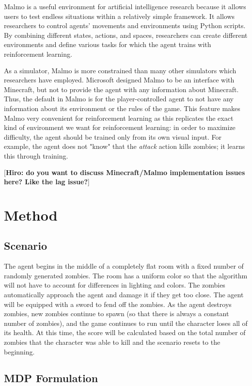 \documentclass{article}
\begin{document}
\begin{multicols}{2}
Malmo is a useful environment for artificial intelligence research because it allows users to test endless situations within a relatively simple framework. It allows researchers to control agents' movements and environments using Python scripts. By combining different states, actions, and spaces, researchers can create different environments and define various tasks for which the agent trains with reinforcement learning.

As a simulator, Malmo is more constrained than many other simulators which researchers have employed. Microsoft designed Malmo to be an interface with Minecraft, but not to provide the agent with any information about Minecraft.
Thus, the default in Malmo is for the player-controlled agent to not have any information about its environment or the rules of the game.
This feature makes Malmo very convenient for reinforcement learning as this replicates the exact kind of environment we want for reinforcement learning: in order to maximize difficulty, the agent should be trained only from its own visual input.
For example, the agent does not "know" that the \emph{attack} action kills zombies; it learns this through training.

[{\bf Hiro: do you want to discuss Minecraft/Malmo implementation issues here? Like the lag issue?}]

\section{Method}

\subsection{Scenario}

The agent begins in the middle of a completely flat room with a fixed number of randomly generated zombies. The room has a uniform color so that the algorithm will not have to account for differences in lighting and colors. The zombies automatically approach the agent and damage it if they get too close. The agent will be equipped with a sword to fend off the zombies. As the agent destroys zombies, new zombies continue to spawn (so that there is always a constant number of zombies), and the game continues to run until the character loses all of its health. At this time, the score will be calculated based on the total number of zombies that the character was able to kill and the scenario resets to the beginning.

\subsection{MDP Formulation}


\end{multicols}
\end{document}
